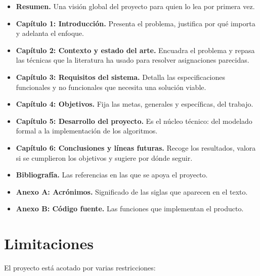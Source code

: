 \documentclass[11pt,a4paper,spanish]{book}
\numberwithin{equation}{chapter}
\numberwithin{figure}{chapter}
\numberwithin{table}{chapter}
\begin{document}
\begin{itemize}
\item {\bf Resumen.} Una visión global del proyecto para quien lo lea por primera vez.
\item {\bf Capítulo 1: Introducción.} Presenta el problema, justifica por qué importa y adelanta el enfoque.
\item {\bf Capítulo 2: Contexto y estado del arte.} Encuadra el problema y repasa las técnicas que la literatura ha usado para resolver asignaciones parecidas.
\item {\bf Capítulo 3: Requisitos del sistema.} Detalla las especificaciones funcionales y no funcionales que necesita una solución viable.
\item {\bf Capítulo 4: Objetivos.} Fija las metas, generales y específicas, del trabajo.
\item {\bf Capítulo 5: Desarrollo del proyecto.} Es el núcleo técnico: del modelado formal a la implementación de los algoritmos.
\item {\bf Capítulo 6: Conclusiones y líneas futuras.} Recoge los resultados, valora si se cumplieron los objetivos y sugiere por dónde seguir.
\item {\bf Bibliografía.} Las referencias en las que se apoya el proyecto.
\item {\bf Anexo A: Acrónimos.} Significado de las siglas que aparecen en el texto.
\item {\bf Anexo B: Código fuente.} Las funciones que implementan el producto.
\end{itemize}


\section{Limitaciones}

El proyecto está acotado por varias restricciones:
\end{document}
